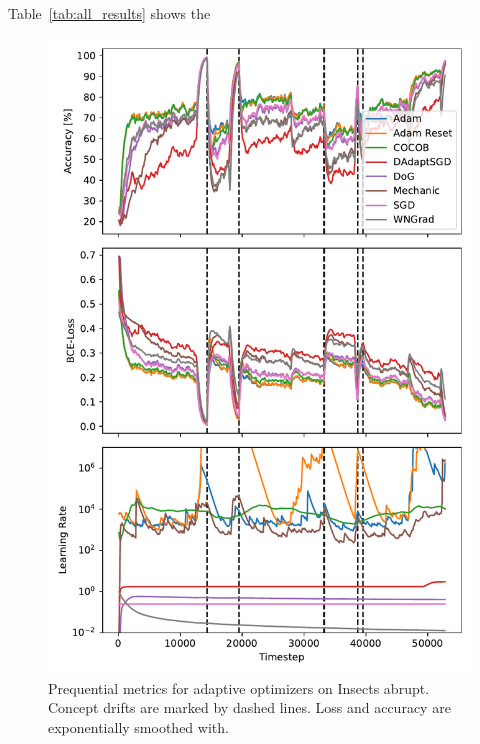 \documentclass[letterpaper]{article} %
\begin{document}
Table~\ref{tab:all_results} shows the 
\begin{figure}
	\centering
	\includegraphics[width=.47\textwidth]{figures/lr_norms_optims_insects_abrupt.pdf}
	\caption{Prequential metrics for adaptive optimizers on Insects abrupt. Concept drifts are marked by dashed lines. Loss and accuracy are exponentially smoothed with.}
	\label{fig:prequential_schedulers_insects}
\end{figure}
\end{document}

